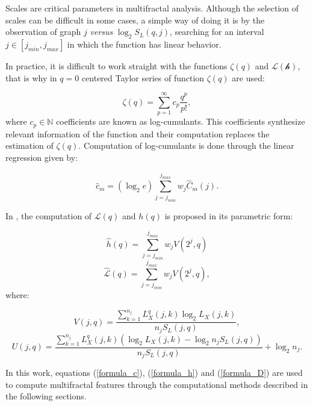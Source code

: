 \documentclass{article}
\begin{document}
Scales are critical parameters in multifractal analysis. Although the selection of scales can be difficult in some cases, a simple way of doing it is by the observation of graph $j$ \textit{versus} $\log_2S_L(q, j)$, searching for an interval $j \in \left[j_{min} ,j_{max} \right]$ in which the function has linear behavior. 

In practice, it is difficult to work straight with the functions $\zeta(q)$ and $\mathcal{L(h)}$, that is why in \citep{castaing1993log} $q=0$ centered Taylor series of function $\zeta(q)$ are used:

\begin{equation}
	\zeta(q)=\sum_{p=1}^{\infty} c_{p}\frac{q^{p}}{ p!},
\end{equation}
where $c_p \in \mathbb{N}$ coefficients are known as log-cumulants. This coefficients synthesize relevant information of the function and their computation replaces the  estimation of $\zeta(q)$. Computation of log-cumulants is done through the linear regression given by:

\begin{equation}\label{formula_c}
	\hat{c}_m = (\log_2{e}) \displaystyle \sum_{j=j_{min}}^{j_{max}} w_j\hat{C}_m(j). 
\end{equation}

In \citep{wendt2009wavelet}, the computation of $\mathcal{L}(q)$ and $h(q)$ is proposed in its parametric form:

\begin{equation}\label{formula_h}
	\hat{h}(q)= \displaystyle \sum_{j=j_{min}}^{j_{max}} w_jV(2^j, q)
\end{equation}
\begin{equation}\label{formula_D}
	\hat{\mathcal{L}}(q)=\displaystyle \sum_{j=j_{min}}^{j_{max}} w_jV(2^j, q),
\end{equation}
where:

\begin{equation}
	V(j, q) = \frac{\displaystyle \sum_{k=1}^{n_j} L ^q_X (j, k) \log_2{L_X(j, k)}}{n_jS_L(j, q)},
\end{equation} 
\begin{equation}
	U(j, q) = \frac{\displaystyle \sum_{k=1}^{n_j} L ^q_X (j, k) (\log_2{L_X(j, k)} - \log_2{n_j S_L(j, q)})}{n_jS_L(j, q)} + \log_2{n_j}.
\end{equation} 

In this work, equations (\ref{formula_c}), (\ref{formula_h}) and (\ref{formula_D}) are used to compute multifractal features through the computational methods described in the following sections.
\end{document}
